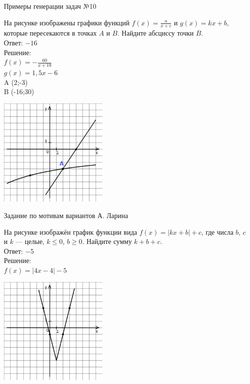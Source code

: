 \documentclass[aspectratio=169]{beamer}
\begin{document}
\begin{frame}{Примеры генерации задач №10}
    \begin{multicols}{2}
        На рисунке изображены графики функций $f (x)=\frac{a}{x+c}$ и $g (x)=kx+b$, которые пересекаются в точках $A$ и $B$. Найдите абсциссу точки $B$.\\

        Ответ: $-16$ \\

        Решение: \\
        $f (x)=-\frac{60}{x+18}$\\
        $g (x)=1,5x-6$\\
        A (2;-3)\\
        B (-16;30)

        \includegraphics[width=0.4\textwidth]{images/17222136364202n0.png}
    \end{multicols}
    

\end{frame}

\begin{frame}{Задание по мотивам вариантов А. Ларина}

    \begin{multicols}{2}
        На рисунке изображён график функции вида $f (x)=|kx+b|+c$, где числа $b$, $c$ и $k$ — целые, $k \leq 0$, $b\geq0$. Найдите сумму $k+b+c$.\\

        Ответ: $-5$\\

        Решение: \\
        $f (x)=|4x-4|-5$

        \includegraphics[width=0.4\textwidth]{images/453912618511153n0.png}
    
    \end{multicols}
\end{frame}
\end{document}
